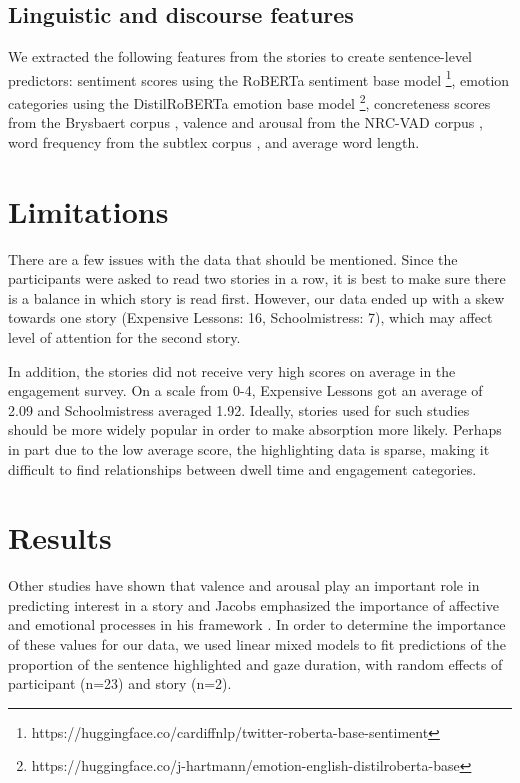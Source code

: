 \documentclass[11pt]{article}
\begin{document}
\subsection{Linguistic and discourse features}

We extracted the following features from the stories to create sentence-level predictors: sentiment scores using the RoBERTa sentiment base model \footnote{https://huggingface.co/cardiffnlp/twitter-roberta-base-sentiment}, emotion categories using the DistilRoBERTa emotion base model \footnote{https://huggingface.co/j-hartmann/emotion-english-distilroberta-base}, concreteness scores from the Brysbaert corpus \citep{brysbaert2014}, valence and arousal from the NRC-VAD corpus \citep{valence_arousal_dominance_2013}, word frequency from the subtlex corpus \citep{Brysbaert_2015}, and average word length.

\section{Limitations}

There are a few issues with the data that should be mentioned. Since the participants were asked to read two stories in a row, it is best to make sure there is a balance in which story is read first. However, our data ended up with a skew towards one story (Expensive Lessons: 16, Schoolmistress: 7), which may affect level of attention for the second story. 

In addition, the stories did not receive very high scores on average in the engagement survey. On a scale from 0-4, Expensive Lessons got an average of 2.09 and Schoolmistress averaged 1.92. Ideally, stories used for such studies should be more widely popular in order to make absorption more likely. Perhaps in part due to the low average score, the highlighting data is sparse, making it difficult to find relationships between dwell time and engagement categories.

\section{Results}

Other studies have shown that valence and arousal play an important role in predicting interest in a story \citep{Maslej2019TheTF, HSU201596} and Jacobs emphasized the importance of affective and emotional processes in his framework \citep{willems_2015}. In order to determine the importance of these values for our data, we used linear mixed models to fit predictions of the proportion of the sentence highlighted and gaze duration, with random effects of participant (n=23) and story (n=2).
\end{document}
